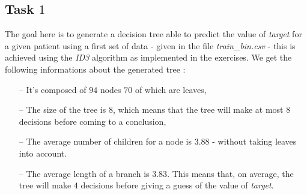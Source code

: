 \documentclass[8pt]{extarticle}
\DeclarePairedDelimiter\ceil{\lceil}{\rceil}
\begin{document}
\subsection{Task $1$}
	The goal here is to generate a decision tree able to predict the value of \emph{target} for a given patient using a first set of data - given in the file \emph{train\_bin.csv} - this is achieved using the \emph{ID3} algorithm as implemented in the exercises. We get the following informations about the generated tree :
	\begin{itemize}[topsep=0pt,itemsep=0pt,partopsep=0pt, parsep=0pt]
		\item[--] It's composed of $94$ nodes $70$ of which are leaves,
		\item[--] The size of the tree is 8, which means that the tree will make at most $8$ decisions before coming to a conclusion,
		\item[--] The average number of children for a node is $3.88$ - without taking leaves into account.
		\item[--] The average length of a branch is $3.83$.  This means that, on average, the tree will make $4$ decisions before giving a guess of the value of \emph{target}.
	\end{itemize}
\end{document}
